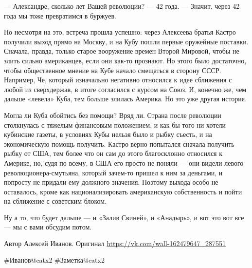 — Александре, сколько лет Вашей революции?
— 42 года.
— Значит, через 42 года мы тоже превратимся в буржуев.

Но несмотря на это, встреча прошла успешно: через Алексеева братья Кастро получили выход прямо на Москву, и на Кубу пошли первые оружейные поставки. Сначала, правда, только старое вооружение времен Второй Мировой, чтобы не злить сильно американцев, если они как-то прознают. Но этого было достаточно, чтобы общественное мнение на Кубе начало смещаться в сторону СССР. Например, Че, который изначально негативно относился к идее сближения с любой из сверхдержав, в итоге согласился с курсом на Союз. И, конечно же, чем дальше «левела» Куба, тем больше злилась Америка. Но это уже другая история.

Могла ли Куба обойтись без помощи? Вряд ли. Страна после революции столкнулась с тяжелым финансовым положением, и как бы того ни хотели кубинские газеты, в условиях Кубы нельзя было и рыбку съесть, и на экономическую помощь получить. Кастро верно попытался сначала получить рыбку от США, тем более что он сам до этого благосклонно относился к Америке, но, судя по всему, в США его просто не поняли — они видели левого революционера-смутьяна, который зачем-то пришел к ним за деньгами, и попросту не придали ему должного значения. Поэтому выхода особо не оставалось, кроме как национализировать американскую собственность и пойти на сближение с советским блоком.

Ну а то, что будет дальше — и «Залив Свиней», и «Анадырь», и вот это вот все — мы с вами обсудим потом.



Автор Алексей Иванов.  Оригинал \url{https://vk.com/wall-162479647_287551}

\#Иванов@catx2
\#Заметка@catx2


